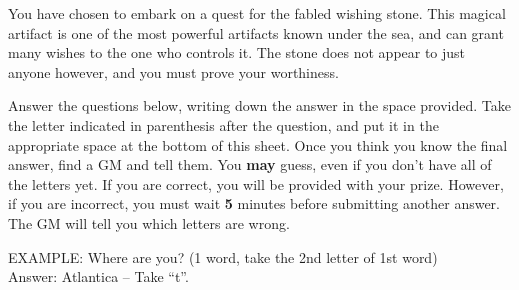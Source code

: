 \documentclass[green]{NeptuneBall}
\begin{document}
\name{\gWS{}}

You have chosen to embark on a quest for the fabled wishing stone. This magical artifact is one of the most powerful artifacts known under the sea, and can grant many wishes to the one who controls it. The stone does not appear to just anyone however, and you must prove your worthiness.

Answer the questions below, writing down the answer in the space provided. Take the letter indicated in parenthesis after the question, and put it in the appropriate space at the bottom of this sheet. Once you think you know the final answer, find a GM and tell them. You {\bf may} guess, even if you don't have all of the letters yet. If you are correct, you will be provided with your prize. However, if you are incorrect, you must wait {\bf 5} minutes before submitting another answer. The GM will tell you which letters are wrong.

EXAMPLE:
Where are you? (1 word, take the 2nd letter of 1st word)\\
Answer: Atlantica  -- Take ``t''.
		
\end{document}
